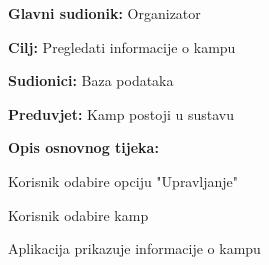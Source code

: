 					\noindent {}
					\begin{packed_item}
						
						\item \textbf{Glavni sudionik: } Organizator
						\item  \textbf{Cilj:} Pregledati informacije o kampu
						\item  \textbf{Sudionici:} Baza podataka
						\item  \textbf{Preduvjet:} Kamp postoji u sustavu
						\item  \textbf{Opis osnovnog tijeka:}
						
						\item[] \begin{packed_enum}
							
							\item Korisnik odabire opciju "Upravljanje"	
							\item Korisnik odabire kamp
							\item Aplikacija prikazuje informacije o kampu
						\end{packed_enum}

					\end{packed_item}
					
